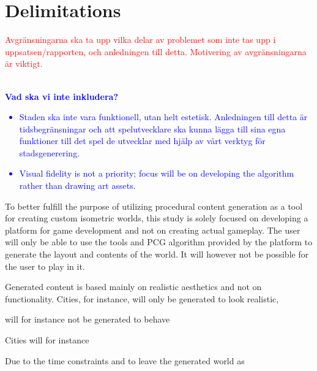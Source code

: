 \section{Delimitations}
\textcolor{red}{
Avgränsningarna ska ta upp vilka delar av problemet som inte tas upp i uppsatsen/rapporten, och anledningen till detta. Motivering av avgränsningarna är viktigt.
}
\\\\
\textcolor{blue}{
\textbf{Vad ska vi inte inkludera?}
\begin{itemize}
    \item Staden ska inte vara funktionell, utan helt estetisk. Anledningen till detta är tidsbegränsningar och att spelutvecklare ska kunna lägga till sina egna funktioner till det spel de utvecklar med hjälp av vårt verktyg för stadsgenerering.
    \item Visual fidelity is not a priority; focus will be on developing the algorithm rather than drawing art assets. 
\end{itemize}
}

To better fulfill the purpose of utilizing procedural content generation as a tool for creating custom isometric worlds, this study is solely focused on developing a platform for game development and not on creating actual gameplay. The user will only be able to use the tools and PCG algorithm provided by the platform to generate the layout and contents of the world. It will however not be possible for the user to play in it. 

Generated content is based mainly on realistic aesthetics and not on functionality. Cities, for instance, will only be generated to look realistic, 

will for instance not be generated to behave 


Cities will for instance 


Due to the time constraints and to leave the generated world as